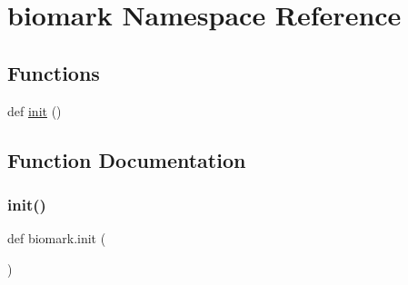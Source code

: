 \hypertarget{namespacebiomark}{}\section{biomark Namespace Reference}
\label{namespacebiomark}
\subsection*{Functions}
\begin{DoxyCompactItemize}
\item 
def \hyperlink{namespacebiomark_ac50585051412a7c2a38f962a149e56b1}{init} ()
\end{DoxyCompactItemize}


\subsection{Function Documentation}
\mbox{\label{namespacebiomark_ac50585051412a7c2a38f962a149e56b1}} 
\subsubsection{\texorpdfstring{init()}{init()}}
{\footnotesize\ttfamily def biomark.\+init (\begin{DoxyParamCaption}{ }\end{DoxyParamCaption})}

